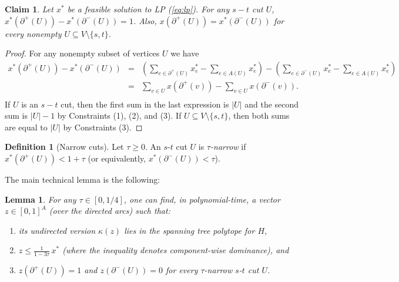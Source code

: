 \documentclass[11pt]{article}
\newtheorem{claim}[theorem]{Claim}
\newtheorem{lemma}[theorem]{Lemma}
\theoremstyle{definition}
\newtheorem{definition}[theorem]{Definition}
\newcounter{note}[section]
\begin{document}
\begin{claim} \label{claim:lp}
Let $x^*$ be a feasible solution to LP (\ref{eq:lp}). For any $s-t$ cut $U$, $x^*(\partial^+(U)) - x^*(\partial^-(U)) = 1$.
Also, $x(\partial^+(U)) = x^*(\partial^-(U))$ for every nonempty $U \subseteq V \setminus \{s,t\}$.
\end{claim}
\begin{proof}
For any nonempty subset of vertices $U$ we have
\begin{eqnarray*}
x^*(\partial^+(U)) - x^*(\partial^-(U)) & = & \left(\sum_{e \in \partial^+(U)} x^*_e - \sum_{e \in A(U)}  x^*_e\right) - \left(\sum_{e \in \partial^-(U)} x^*_e - \sum_{e \in A(U)} x^*_e \right) \\
& = & \sum_{v \in U} x(\partial^+(v)) - \sum_{v \in U} x(\partial^-(v)). \\
\end{eqnarray*}
If $U$ is an $s-t$ cut, then the first sum in the last expression is $|U|$ and the second sum is $|U|-1$ by Constraints (1), (2), and (3). If $U \subseteq V \setminus \{s,t\}$,
then both sums are equal to $|U|$ by Constraints (3).
\end{proof}


\begin{definition}[Narrow cuts]
  Let $\tau \geq 0$. An $s$-$t$ cut $U$ is \emph{$\tau$-narrow} if
  $x^*(\partial^+(U)) < 1 + \tau$ (or equivalently, $x^*(\partial^-(U)) <
  \tau$).
\end{definition}

The main technical lemma is the following:
\begin{lemma}\label{lem:fix_sol}
  For any $\tau \in [0,1/4]$, one can find, in polynomial-time, a vector
  $z \in [0,1]^A$ (over the directed arcs) such that:
  \begin{enumerate}
  \item[(a)] its undirected version $\kappa(z)$ lies in the spanning tree
    polytope for $H$,
  \item[(b)] $z \leq \frac{1}{1-3\tau} \, x^*$ (where the inequality
    denotes component-wise dominance), and
  \item[(c)] $z(\partial^+(U)) = 1$ and $z(\partial^-(U)) = 0$ for every
    $\tau$-narrow $s$-$t$ cut $U$.
\end{enumerate}
\end{lemma}
\end{document}
